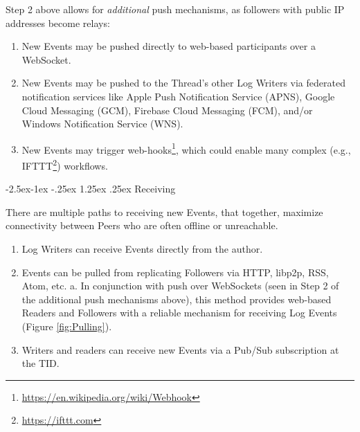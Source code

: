 \documentclass{textile}
\makeatletter
\renewcommand\paragraph{\@startsection{paragraph}{4}{\z@}%
            {-2.5ex\@plus -1ex \@minus -.25ex}%
            {1.25ex \@plus .25ex}%
            {\normalfont\normalsize\itshape}}
\makeatother
\begin{document}
Step 2 above allows for \emph{additional} push mechanisms, as followers with public IP addresses become relays:

\begin{enumerate}
\item New Events may be pushed directly to web-based participants over a WebSocket.
\item New Events may be pushed to the Thread's other Log Writers via federated notification services like Apple Push Notification Service (APNS), Google Cloud Messaging (GCM), Firebase Cloud Messaging (FCM), and/or Windows Notification Service (WNS).
\item New Events may trigger web-hooks\footnote{\url{https://en.wikipedia.org/wiki/Webhook}}, which could enable many complex (e.g., IFTTT\footnote{\url{https://ifttt.com}}) workflows.
\end{enumerate}

\paragraph{Receiving}

There are multiple paths to receiving new Events, that together, maximize connectivity between Peers who are often offline or unreachable.

\begin{enumerate}
\item Log Writers can receive Events directly from the author.
\item Events can be pulled from replicating Followers via HTTP, libp2p, RSS, Atom, etc.
    a. In conjunction with push over WebSockets (seen in Step 2 of the additional push mechanisms above), this method provides web-based Readers and Followers with a reliable mechanism for receiving Log Events (Figure \ref{fig:Pulling}).
\item Writers and readers can receive new Events via a Pub/Sub subscription at the TID.
\end{enumerate}
\end{document}
